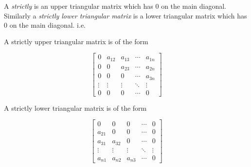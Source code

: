\documentclass[12pt]{article}
\begin{document}
A \emph{strictly } is an upper triangular matrix which has $0$ on the main diagonal.  Similarly a \emph{strictly lower triangular matrix} is a lower triangular matrix which has $0$ on the main diagonal. i.e.

A strictly upper triangular matrix is of the form

$$ \begin{bmatrix}
0 & a_{12} & a_{13} & \cdots & a_{1n} \\
0 & 0 & a_{23} & \cdots & a_{2n} \\
0 & 0 & 0 & \cdots & a_{3n} \\
\vdots & \vdots & \vdots & \ddots & \vdots \\
0 & 0 & 0 & \cdots & 0
\end{bmatrix} $$

A strictly lower triangular matrix is of the form

$$ \begin{bmatrix}
0 & 0 & 0 & \cdots & 0 \\
a_{21} & 0 & 0 & \cdots & 0 \\
a_{31} & a_{32} & 0 & \cdots & 0 \\
\vdots & \vdots & \vdots & \ddots & \vdots \\
a_{n1} & a_{n2} & a_{n3} & \cdots & 0
\end{bmatrix} $$
\end{document}
